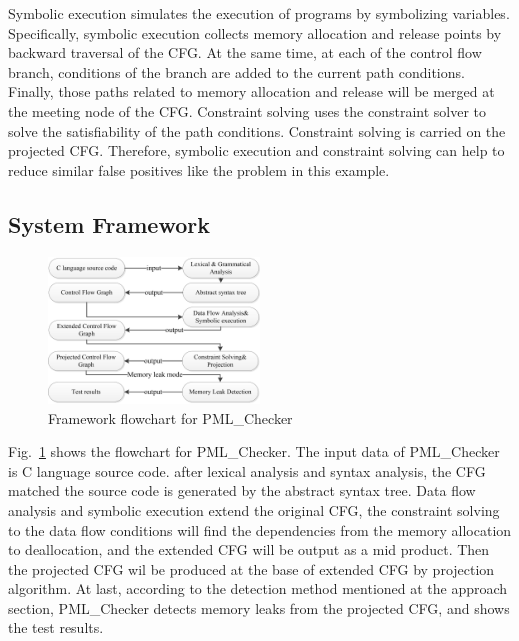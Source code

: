 Symbolic execution simulates the execution of programs by symbolizing variables. Specifically, symbolic execution collects memory allocation and release points by backward traversal of the CFG. At the same time, at each of the control flow branch, conditions of the branch are added to the current path conditions. Finally, those paths related to memory allocation and release will be merged at the meeting node of the CFG. Constraint solving uses the constraint solver to solve the satisfiability of the path conditions. Constraint solving is carried on the projected CFG. Therefore, symbolic execution and constraint solving can help to reduce similar false positives like the problem in this example.

\subsection{System Framework}

\begin{figure}[!h]
\small
\centering
\includegraphics[width=0.5\textwidth]{figure/fig8-fig12/fig_new}
\caption{Framework flowchart for PML\_Checker}\label{fig:18}
\end{figure}

Fig.~\ref{fig:18} shows the flowchart for PML\_Checker. The input data of PML\_Checker is C language source code. after lexical analysis and syntax analysis, the CFG matched the source code is generated by the abstract syntax tree. Data flow analysis and symbolic execution extend the original CFG, the constraint solving to the data flow conditions will find the dependencies from the memory allocation to deallocation, and the extended CFG will be output as a mid product. Then the projected CFG wil be produced at the base of extended CFG by projection algorithm. At last, according to the detection method mentioned at the approach section, PML\_Checker detects memory leaks from the projected CFG, and shows the test results. 

